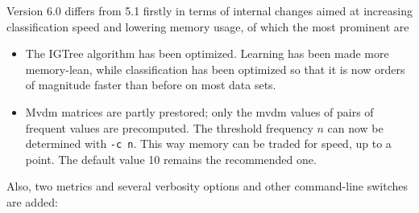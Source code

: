\documentclass{report}
\begin{document}
Version 6.0 differs from 5.1 firstly in terms of internal changes
aimed at increasing classification speed and lowering memory usage, of
which the most prominent are

\begin{itemize}

\item The {\sc IGTree} algorithm has been optimized. Learning has been
  made more memory-lean, while classification has been optimized so
  that it is now orders of magnitude faster than before on most data sets.

\item {\sc Mvdm} matrices are partly prestored; only the {\sc mvdm}
  values of pairs of frequent values are precomputed. The threshold
  frequency $n$ can now be determined with {\tt -c n}. This way memory
  can be traded for speed, up to a point. The default value 10 remains
  the recommended one.

\end{itemize}

Also, two metrics and several verbosity options and other command-line
switches are added:
\end{document}
